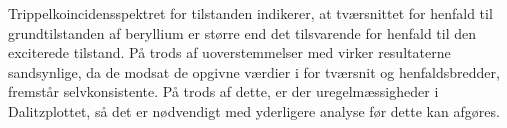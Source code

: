 Trippelkoincidensspektret for tilstanden indikerer, at tværsnittet for henfald til
grundtilstanden af beryllium er større end det tilsvarende for henfald til den exciterede
tilstand. På trods af uoverstemmelser med \cite{States} virker resultaterne sandsynlige, da de
modsat de opgivne værdier i \cite{States} for tværsnit og henfaldsbredder, fremstår
selvkonsistente. På trods af dette, er der uregelmæssigheder i Dalitzplottet, så det er nødvendigt
med yderligere analyse før dette kan afgøres.
